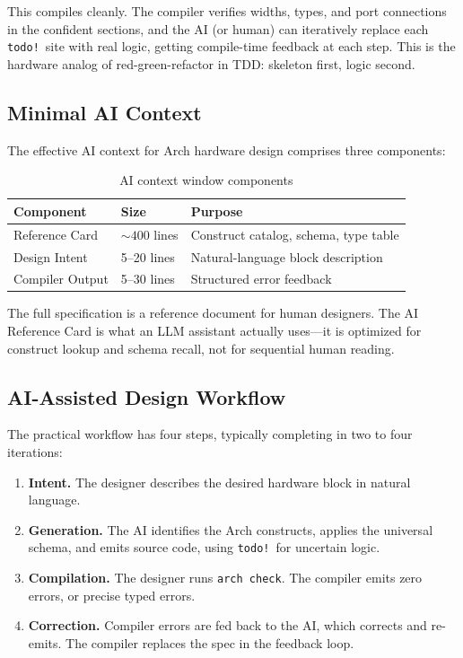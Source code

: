 \documentclass[11pt,twocolumn]{article}
\begin{document}
This compiles cleanly. The compiler verifies widths, types, and port connections in the confident sections, and the AI (or human) can iteratively replace each \texttt{todo!}\ site with real logic, getting compile-time feedback at each step. This is the hardware analog of red-green-refactor in TDD: skeleton first, logic second.

\subsection{Minimal AI Context}

The effective AI context for Arch hardware design comprises three components:

\begin{table}[t]
\centering
\caption{AI context window components}
\label{tab:aicontext}
\small
\begin{tabular}{@{}llp{3.2cm}@{}}
\toprule
\textbf{Component} & \textbf{Size} & \textbf{Purpose} \\
\midrule
Reference Card & ${\sim}400$ lines & Construct catalog, schema, type table \\
Design Intent & 5--20 lines & Natural-language block description \\
Compiler Output & 5--30 lines & Structured error feedback \\
\bottomrule
\end{tabular}
\end{table}

The full specification is a reference document for human designers.
The AI Reference Card is what an LLM assistant actually uses---it is optimized for construct lookup and schema recall, not for sequential human reading.

\subsection{AI-Assisted Design Workflow}

The practical workflow has four steps, typically completing in two to four iterations:

\begin{enumerate}
\item \textbf{Intent.} The designer describes the desired hardware block in natural language.
\item \textbf{Generation.} The AI identifies the Arch constructs, applies the universal schema, and emits source code, using \texttt{todo!}\ for uncertain logic.
\item \textbf{Compilation.} The designer runs \texttt{arch check}. The compiler emits zero errors, or precise typed errors.
\item \textbf{Correction.} Compiler errors are fed back to the AI, which corrects and re-emits. The compiler replaces the spec in the feedback loop.
\end{enumerate}
\end{document}
